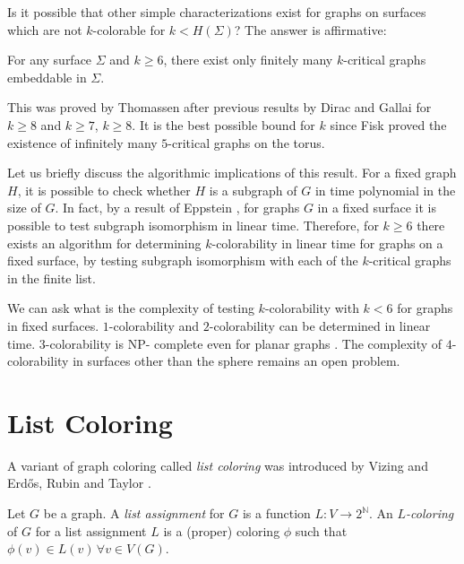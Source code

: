 Is it possible that other simple characterizations exist for graphs on surfaces which are 
not $k$-colorable for $k < H(\Sigma)$? The answer is affirmative:

\begin{theorem}
For any surface $\Sigma$ and $k \geq 6$, there exist only finitely many $k$-critical graphs 
embeddable in $\Sigma$.
\end{theorem}

This was proved by Thomassen after previous results by Dirac and Gallai for $k \geq 8$
and $k \geq 7$, $k \geq 8$. It is the best possible bound for $k$ since Fisk \cite{fisk} proved
the existence of infinitely many $5$-critical graphs on the torus.

Let us briefly discuss the algorithmic implications of this result. For a fixed graph $H$, it 
is possible to check whether $H$ is a subgraph of $G$ in time polynomial in the size of $G$.
In fact, by a result of Eppstein \cite{eppstein}, for graphs $G$ in a fixed surface
it is possible to test subgraph isomorphism in linear time. Therefore, for $k \geq 6$ there exists an algorithm for determining $k$-colorability in linear time for graphs on a fixed surface,
by testing subgraph isomorphism with each of the $k$-critical graphs in the finite list. 

We can ask what is the complexity of testing $k$-colorability with $k < 6$ for graphs in fixed 
surfaces.
$1$-colorability and $2$-colorability can be determined in linear time. $3$-colorability is NP-
complete even for planar graphs \cite{3colorabilitynpcomplete}. The complexity of $4$-colorability 
in surfaces other than the
sphere remains an open problem. 

\section{List Coloring}

A variant of graph coloring called \emph{list coloring} was introduced
by Vizing \cite{vizinglistcoloring} and Erdős, Rubin and Taylor \cite{erdoschoosability}.

\begin{definition}
	Let $G$ be a graph. A \emph{list assignment} for $G$ is a function 
	$L : V \rightarrow 2^{\mathbb{N}}$. An \emph{$L$-coloring} of $G$ for a list assignment
	$L$ is a (proper) coloring $\phi$ such that $\phi(v) \in L(v) \, \forall v \in V(G)$. 
\end{definition}

